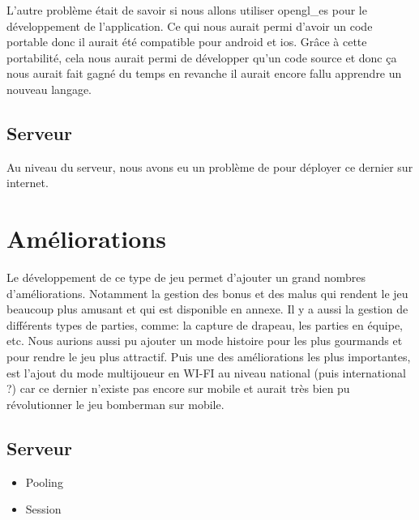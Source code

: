 		L'autre problème était de savoir si nous allons utiliser \gls{opengl_es} pour le développement de l'application. Ce qui nous aurait permi d'avoir un code portable donc il aurait été compatible pour \gls{android} et \gls{ios}. Grâce à cette portabilité, cela nous aurait permi de développer qu'un code source et donc ça nous aurait fait gagné du temps en revanche il aurait encore fallu apprendre un nouveau langage.

	
	\subsection{Serveur}
		Au niveau du serveur, nous avons eu un problème de pour déployer ce dernier sur internet.

	
\section{Améliorations}
	Le développement de ce type de jeu permet d'ajouter un grand nombres d'améliorations. Notamment la gestion des bonus et des malus qui rendent le jeu beaucoup plus amusant et qui est disponible en annexe. Il y a aussi la gestion de différents types de parties, comme: la capture de drapeau,  les parties en équipe, etc. Nous aurions aussi pu ajouter un mode histoire pour les plus gourmands et pour rendre le jeu plus attractif. Puis une des améliorations les plus importantes, est l'ajout du mode multijoueur en WI-FI au niveau national (puis international ?) car ce dernier n'existe pas encore sur mobile et aurait très bien pu révolutionner le jeu bomberman sur mobile.


\subsection{Serveur}
	\begin{itemize}
		\item{Pooling}
		\item{Session}
	\end{itemize}

